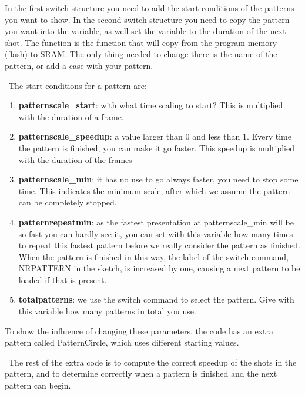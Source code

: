 {In the first switch structure you need to add the start conditions of the patterns you want to show. In the second switch structure you need to copy the pattern you want into the  variable, as well set the  variable to the duration of the next shot. The function  is the function that will copy from the program memory (flash) to SRAM. The only thing needed to change there is the name of the pattern, or add a case with your pattern.

\textbullet \  The start conditions for a pattern are:
\begin{enumerate}
 \item \textbf{patternscale\_start}: with what time scaling to start? This is multiplied with the duration of a frame.
 \item \textbf{patternscale\_speedup}: a value larger than 0 and less than 1. Every time the pattern is finished, you can make it go faster. This speedup is multiplied with the duration of the frames
 \item \textbf{patternscale\_min}: it has no use to go always faster, you need to stop some time. This indicates the minimum scale, after which we assume the pattern can be completely stopped.
 \item \textbf{patternrepeatmin}: as the fastest presentation at patternscale\_min will be so fast you can hardly see it, you can set with this variable how many times to repeat this fastest pattern before we really consider the pattern as finished. When the pattern is finished in this way, the label of the switch command, NRPATTERN in the sketch, is increased by one, causing a next pattern to be loaded if that is present.
 \item \textbf{totalpatterns}: we use the switch command to select the pattern. Give with this variable how many patterns in total you use. 
\end{enumerate}
To show the influence of changing these parameters, the code has an extra pattern called PatternCircle, which uses different starting values.

\textbullet \ The rest of the extra code is to compute the correct speedup of the shots in the pattern, and to determine correctly when a pattern is finished and the next pattern can begin.
}



